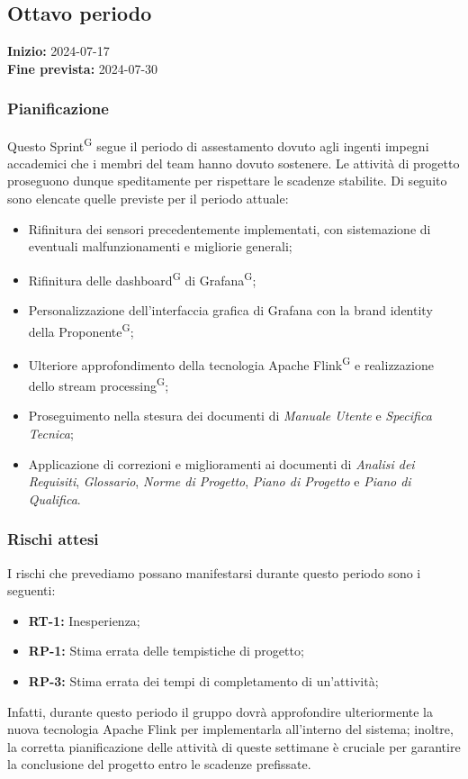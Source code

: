 \documentclass[8pt]{article}
\newcommand{\glossterm}[1]{#1\textsuperscript{G}} %
\begin{document}
\subsection{Ottavo periodo}
\textbf{Inizio:} 2024-07-17\\
\textbf{Fine prevista:} 2024-07-30
\subsubsection{Pianificazione}
Questo \glossterm{Sprint} segue il periodo di assestamento dovuto agli ingenti impegni accademici che i membri del team hanno dovuto sostenere. Le attività di progetto proseguono dunque speditamente per rispettare le scadenze stabilite. Di seguito sono elencate quelle previste per il periodo attuale:
\begin{itemize}
\setlength\itemsep{0em}
    \item Rifinitura dei sensori precedentemente implementati, con sistemazione di eventuali malfunzionamenti e migliorie generali;
    \item Rifinitura delle \glossterm{dashboard} di \glossterm{Grafana};
    \item Personalizzazione dell'interfaccia grafica di Grafana con la brand identity della \glossterm{Proponente};
    \item Ulteriore approfondimento della tecnologia Apache \glossterm{Flink} e realizzazione dello \glossterm{stream processing};
    \item Proseguimento nella stesura dei documenti di \textit{Manuale Utente} e \textit{Specifica Tecnica};
    \item Applicazione di correzioni e miglioramenti ai documenti di \textit{Analisi dei Requisiti}, \textit{Glossario}, \textit{Norme di Progetto}, \textit{Piano di Progetto} e \textit{Piano di Qualifica}.
\end{itemize}
\subsubsection{Rischi attesi}
I rischi che prevediamo possano manifestarsi durante questo periodo sono i seguenti:
\begin{itemize}
\setlength\itemsep{0em}
    \item \textbf{RT-1:} Inesperienza;
    \item \textbf{RP-1:} Stima errata delle tempistiche di progetto;
    \item \textbf{RP-3:} Stima errata dei tempi di completamento di un'attività;
\end{itemize}
Infatti, durante questo periodo il gruppo dovrà approfondire ulteriormente la nuova tecnologia Apache Flink per implementarla all'interno del sistema; inoltre, la corretta pianificazione delle attività di queste settimane è cruciale per garantire la conclusione del progetto entro le scadenze prefissate.
\newpage
\end{document}
